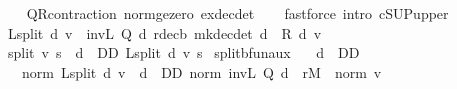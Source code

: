 \begin{isabellebody}
%
\isadelimproof
\ \ %
\endisadelimproof
%
\isatagproof
{}\isamarkupfalse%
\ QR{\isacharunderscore}{\kern0pt}contraction\ norm{\isacharunderscore}{\kern0pt}ge{\isacharunderscore}{\kern0pt}zero\ ex{\isacharunderscore}{\kern0pt}dec{\isacharunderscore}{\kern0pt}det\isanewline
\ \ \isamarkupfalse%
\ {\isacharparenleft}{\kern0pt}fastforce\ intro{\isacharbang}{\kern0pt}{\isacharcolon}{\kern0pt}\ cSUP{\isacharunderscore}{\kern0pt}upper{}{\isacharparenright}{\kern0pt}%
\endisatagproof
{\isafoldproof}%
%
\isadelimproof
%
\endisadelimproof
%
\isadelimdocument
%
\endisadelimdocument
%
\isatagdocument
%
\isamarkuptrue%
%
\endisatagdocument
{\isafolddocument}%
%
\isadelimdocument
%
\endisadelimdocument
{}\isamarkupfalse%
\ {\isachardoublequoteopen}L{\isacharunderscore}{\kern0pt}split\ d\ v\ {\isasymequiv}\ inv\isactrlsub L\ {\isacharparenleft}{\kern0pt}Q\ d{\isacharparenright}{\kern0pt}\ {\isacharparenleft}{\kern0pt}r{\isacharunderscore}{\kern0pt}dec\isactrlsub b\ {\isacharparenleft}{\kern0pt}mk{\isacharunderscore}{\kern0pt}dec{\isacharunderscore}{\kern0pt}det\ d{\isacharparenright}{\kern0pt}\ {\isacharplus}{\kern0pt}\ R\ d\ v{\isacharparenright}{\kern0pt}{\isachardoublequoteclose}\isanewline
\isanewline
{}\isamarkupfalse%
\ {\isachardoublequoteopen}{\isasymL}{\isacharunderscore}{\kern0pt}split\ v\ s\ {\isacharequal}{\kern0pt}\ {\isacharparenleft}{\kern0pt}{\isasymSqunion}d\ {\isasymin}\ D\isactrlsub D{\isachardot}{\kern0pt}\ L{\isacharunderscore}{\kern0pt}split\ d\ v\ s{\isacharparenright}{\kern0pt}{\isachardoublequoteclose}\isanewline
\isanewline
{}\isamarkupfalse%
\ {\isasymL}{\isacharunderscore}{\kern0pt}split{\isacharunderscore}{\kern0pt}bfun{\isacharunderscore}{\kern0pt}aux{\isacharcolon}{\kern0pt}\isanewline
\ \ \ {\isachardoublequoteopen}d\ {\isasymin}\ D\isactrlsub D{\isachardoublequoteclose}\isanewline
\ \ \ {\isachardoublequoteopen}norm\ {\isacharparenleft}{\kern0pt}L{\isacharunderscore}{\kern0pt}split\ d\ v{\isacharparenright}{\kern0pt}\ {\isasymle}\ {\isacharparenleft}{\kern0pt}{\isasymSqunion}d\ {\isasymin}\ D\isactrlsub D{\isachardot}{\kern0pt}\ norm\ {\isacharparenleft}{\kern0pt}inv\isactrlsub L\ {\isacharparenleft}{\kern0pt}Q\ d{\isacharparenright}{\kern0pt}{\isacharparenright}{\kern0pt}{\isacharparenright}{\kern0pt}\ {\isacharasterisk}{\kern0pt}\ r\isactrlsub M\ {\isacharplus}{\kern0pt}\ norm\ v{\isachardoublequoteclose}\isanewline
%
\isadelimproof
%
\endisadelimproof
%

\end{isabellebody}
